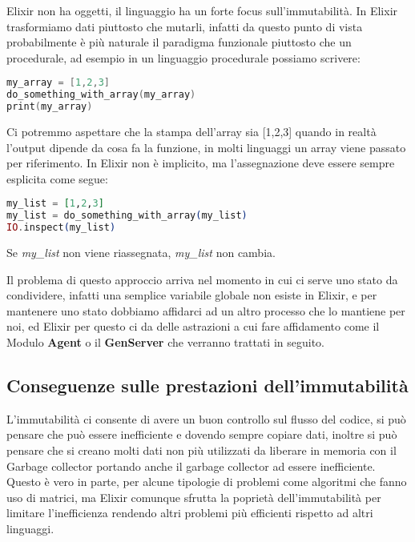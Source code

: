 Elixir non ha oggetti, il linguaggio ha un forte focus sull'immutabilità.
In Elixir trasformiamo dati piuttosto che mutarli, infatti da questo
punto di vista probabilmente è più naturale il paradigma funzionale
piuttosto che un procedurale, ad esempio in un linguaggio
procedurale possiamo scrivere:

\begin{lstlisting}[language=cpp]
my_array = [1,2,3]
do_something_with_array(my_array)
print(my_array)
\end{lstlisting}

Ci potremmo aspettare che la stampa dell'array sia [1,2,3] quando in realtà
l'output dipende da cosa fa la funzione, in molti linguaggi
un array viene passato per riferimento. In Elixir non è implicito,
ma l'assegnazione deve essere sempre esplicita come segue:

\begin{lstlisting}[language=elixir]
my_list = [1,2,3]
my_list = do_something_with_array(my_list)
IO.inspect(my_list)
\end{lstlisting}

Se \textit{my\_list} non viene riassegnata, \textit{my\_list} non cambia.

Il problema di questo approccio arriva nel momento
in cui ci serve uno stato da condividere,
infatti una semplice variabile globale non esiste
in Elixir, e per mantenere uno stato dobbiamo
affidarci ad un altro processo che lo mantiene per noi,
ed Elixir per questo ci da delle astrazioni
a cui fare affidamento come il Modulo \textbf{Agent} o il
\textbf{GenServer} che verranno trattati in seguito.

\subsection{Conseguenze sulle prestazioni dell'immutabilità}

L'immutabilità ci consente di avere un buon controllo
sul flusso del codice, si può pensare che può essere inefficiente
e dovendo sempre copiare dati, inoltre si può pensare che si creano
molti dati non più utilizzati da liberare in memoria con il Garbage collector
portando anche il garbage collector ad essere inefficiente.
Questo è vero in parte, per alcune tipologie di problemi come
algoritmi che fanno uso di matrici, ma Elixir comunque sfrutta
la poprietà dell'immutabilità per limitare l'inefficienza rendendo
altri problemi più efficienti rispetto ad altri linguaggi.

